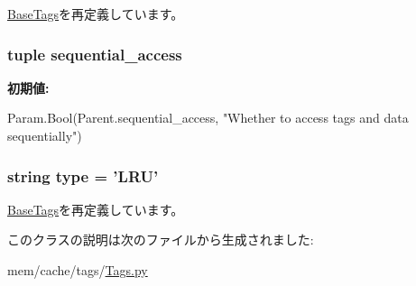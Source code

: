 \hyperlink{classTags_1_1BaseTags_a17da7064bc5c518791f0c891eff05fda}{BaseTags}を再定義しています。\hypertarget{classTags_1_1LRU_a0545f3dc4d67873176d4d70d4618e078}{
\subsubsection[{sequential\_\-access}]{\setlength{\rightskip}{0pt plus 5cm}tuple {\bf sequential\_\-access}}}
\label{classTags_1_1LRU_a0545f3dc4d67873176d4d70d4618e078}
{\bfseries 初期値:}
\begin{DoxyCode}
Param.Bool(Parent.sequential_access,
        "Whether to access tags and data sequentially")
\end{DoxyCode}
\hypertarget{classTags_1_1LRU_acce15679d830831b0bbe8ebc2a60b2ca}{
\subsubsection[{type}]{\setlength{\rightskip}{0pt plus 5cm}string {\bf type} = '{\bf LRU}'}}
\label{classTags_1_1LRU_acce15679d830831b0bbe8ebc2a60b2ca}


\hyperlink{classTags_1_1BaseTags_acce15679d830831b0bbe8ebc2a60b2ca}{BaseTags}を再定義しています。

このクラスの説明は次のファイルから生成されました:\begin{DoxyCompactItemize}
\item 
mem/cache/tags/\hyperlink{Tags_8py}{Tags.py}\end{DoxyCompactItemize}
